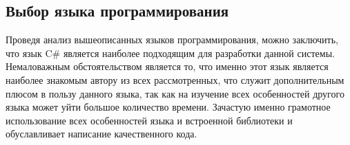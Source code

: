﻿\subsection{Выбор языка программирования}
Проведя анализ вышеописанных языков программирования, можно заключить, что язык C\# является наиболее подходящим для разработки данной системы. Немаловажным обстоятельством является то, что именно этот язык является наиболее знакомым автору из всех рассмотренных, что служит дополнительным плюсом в пользу данного языка, так как на изучение всех особенностей другого языка может уйти большое количество времени. Зачастую именно грамотное использование всех особенностей языка и встроенной библиотеки и обуславливает написание качественного кода.